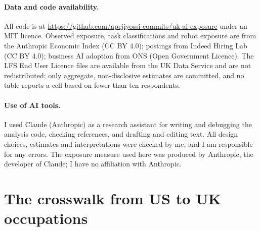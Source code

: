 \documentclass[11pt]{article}
\begin{document}
\paragraph{Data and code availability.} All code is at \url{https://github.com/apejiyossi-commits/uk-ai-exposure} under an MIT licence. Observed exposure, task classifications and robot exposure are from the Anthropic Economic Index (CC BY 4.0); postings from Indeed Hiring Lab (CC BY 4.0); business AI adoption from ONS (Open Government Licence). The LFS End User Licence files are available from the UK Data Service and are not redistributed; only aggregate, non-disclosive estimates are committed, and no table reports a cell based on fewer than ten respondents.

\paragraph{Use of AI tools.} I used Claude (Anthropic) as a research assistant for writing and debugging the analysis code, checking references, and drafting and editing text. All design choices, estimates and interpretations were checked by me, and I am responsible for any errors. The exposure measure used here was produced by Anthropic, the developer of Claude; I have no affiliation with Anthropic.




\appendix
\section{The crosswalk from US to UK occupations}\label{app:crosswalk}
\end{document}
